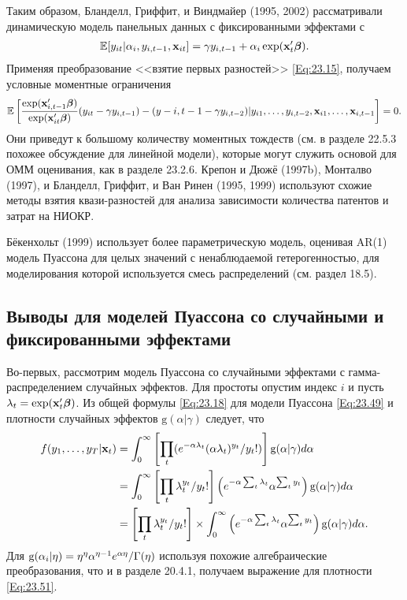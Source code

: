 Таким образом, Бланделл, Гриффит, и Виндмайер (1995, 2002) рассматривали динамическую модель панельных данных с фиксированными эффектами с
\begin{align}
\mathbb{E} [y_{it} | \alpha_i, y_{i,t-1}, \mathbf{x}_{it} ] = \gamma y_{i,t-1} + \alpha_i \exp (\mathbf{x}'_t \bm{\beta}).
\nonumber
\end{align}
Применяя преобразование <<взятие первых разностей>> \ref{Eq:23.15}, получаем условные моментные ограничения
\begin{align}
\mathbb{E} \left[ \frac{\exp (\mathbf{x}'_{i,t-1} \bm{\beta})}{\exp (\mathbf{x}'_{it}\bm{\beta})}
(y_{it} - \gamma y_{i,t-1}) - (y-{i,t-1} - \gamma y_{i,t-2}) | y_{i1}, \dots, y_{i,t-2}, \mathbf{x}_{i1}, \dots, \mathbf{x}_{i,t-1} \right] = 0.
\nonumber
\end{align}
Они приведут к большому количеству моментных тождеств (см. в разделе 22.5.3 похожее обсуждение для линейной модели), которые могут служить основой для ОММ оценивания, как в разделе 23.2.6. Крепон и Дюжё (1997b), Монталво (1997), и Бланделл, Гриффит, и Ван Ринен (1995, 1999) используют схожие методы взятия квази-разностей для анализа зависимости количества патентов и затрат на НИОКР.

Бёкенхольт (1999) использует более параметрическую модель, оценивая AR(1) модель Пуассона для целых значений с ненаблюдаемой гетерогенностью, для моделирования которой используется смесь распределений (см. раздел 18.5). 

\subsection{Выводы для моделей Пуассона со случайными и фиксированными эффектами}

Во-первых, рассмотрим модель Пуассона со случайными эффектами с гамма-распределением случайных эффектов. Для простоты опустим индекс $i$ и пусть $\lambda_t=\exp (\mathbf{x}'_t\bm{\beta})$. Из общей формулы \ref{Eq:23.18} для модели Пуассона \ref{Eq:23.49} и плотности случайных эффектов $\mathrm g(\alpha|\gamma)$ следует, что
\begin{align}
f(y_1, \dots, y_T | \mathbf{x}_t) 
& = \int^{\infty}_0 \left[ \prod_t (e^{-\alpha \lambda_t} (\alpha \lambda_t)^{y_t}/ y_t !) \right]  \mathrm g(\alpha | \gamma) d \alpha 
\nonumber \\
& = \int^{\infty}_0 \left[ \prod_t \lambda_t^{y_t}/y_t ! \right] \left( e^{-\alpha \sum_t \lambda_t} \alpha^{\sum_t y_t} \right) 
\mathrm g(\alpha|\gamma) d \alpha
\nonumber \\
& = \left[ \prod_t \lambda_t^{y_t} /y_t ! \right]
\times \int^{\infty}_0 \left( e^{-\alpha \sum_t \lambda_t} \alpha^{\sum_t y_t} \right) 
\mathrm g(\alpha|\gamma) d \alpha. \nonumber
\end{align}
Для $\mathrm g(\alpha_i|\eta)=\eta^{\eta} \alpha^{\eta-1} e^{\alpha \eta}/\Gamma(\eta)$ используя похожие алгебраические преобразования, что и в разделе 20.4.1, получаем выражение для плотности \ref{Eq:23.51}.

